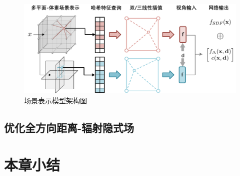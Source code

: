 \begin{figure}[ht]
    \centering
    \includegraphics[width=\textwidth]{undergraduate-thesis/images/omninerf-scene-representation.pdf}
    \caption{场景表示模型架构图}
    \label{fig:omninerf-scene-representation}
\end{figure}

\subsection{优化全方向距离-辐射隐式场}

\section{本章小结}